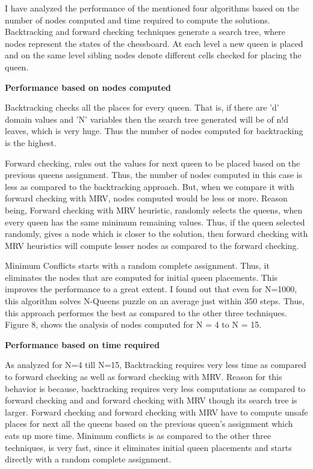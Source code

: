\documentclass[conference]{IEEEtran}
\begin{document}
I have analyzed the performance of the mentioned four algorithms based on the number of nodes computed and time required to compute the solutions. Backtracking and forward checking techniques generate a search tree, where nodes represent the states of the chessboard. At each level a new queen is placed and on the same level sibling nodes denote different cells checked for placing the queen.
\par \textbf{Performance based on nodes computed}
\par Backtracking checks all the places for every queen. That is, if there are 'd' domain values and 'N' variables then the search tree generated will be of n!d leaves, which is very huge. Thus the number of nodes computed for backtracking is the highest.
\par Forward checking, rules out the values for next queen to be placed based on the previous queens assignment. Thus, the number of nodes computed in this case is less as compared to the backtracking approach. But, when we compare it with forward checking with MRV, nodes computed would be less or more. Reason being, Forward checking with MRV heuristic, randomly selects the queens, when every queen has the same minimum remaining values. Thus, if the queen selected randomly, gives a node which is closer to the solution, then forward checking with MRV heuristics will compute lesser nodes as compared to the forward checking.
\par Minimum Conflicts starts with a random complete assignment. Thus, it eliminates the nodes that are computed for initial queen placements. This improves the performance to a great extent. I found out that even for N=1000, this algorithm solves N-Queens puzzle on an average just within 350 steps. Thus, this approach performes the best as compared to the other three techniques.
\\ Figure 8, shows the analysis of nodes computed for N = 4 to N = 15.



\par \textbf{Performance based on time required}

As analyzed for N=4 till N=15, Backtracking requires very less time as compared to forward checking as well as forward checking with MRV. Reason for this behavior is because, backtracking requires very less computations as compared to forward checking and and forward checking with MRV though its search tree is larger. Forward checking and forward checking with MRV have to compute unsafe places for next all the queens based on the previous queen's assignment which eats up more time. Minimum conflicts is as compared to the other three techniques, is very fast, since it eliminates initial queen placements and starts directly with a random complete assignment.
\end{document}
